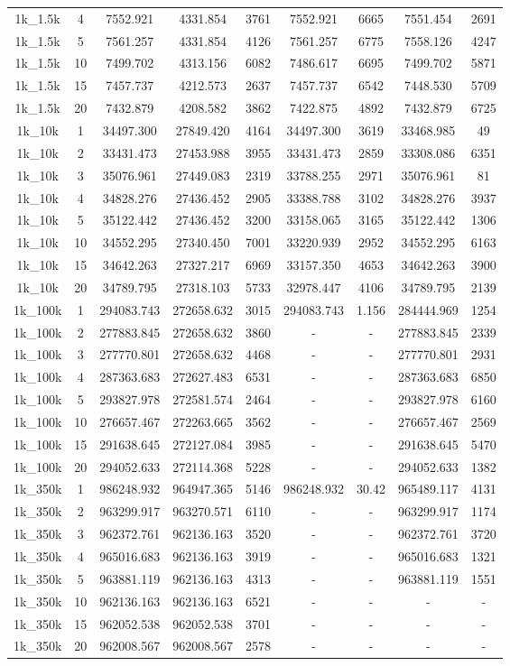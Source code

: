 \documentclass[10pt]{article}
\begin{document}
\begin{table}[h]
\begin{tabular}{ccc|cc|cc|cc}
{1k\_1.5k} & {4} & {7552.921} & {4331.854} & {3761} & {7552.921} & {6665} & {7551.454} & {2691}\tabularnewline
{1k\_1.5k} & {5} & {7561.257} & {4331.854} & {4126} & {7561.257} & {6775} & {7558.126} & {4247}\tabularnewline
{1k\_1.5k} & {10} & {7499.702} & {4313.156} & {6082} & {7486.617} & {6695} & {7499.702} & {5871}\tabularnewline
{1k\_1.5k} & {15} & {7457.737} & {4212.573} & {2637} & {7457.737} & {6542} & {7448.530} & {5709}\tabularnewline
{1k\_1.5k} & {20} & {7432.879} & {4208.582} & {3862} & {7422.875} & {4892} & {7432.879} & {6725}\tabularnewline
\hline 
{1k\_10k} & {1} & {34497.300} & {27849.420} & {4164} & {34497.300} & {3619} & {33468.985} & {49}\tabularnewline
{1k\_10k} & {2} & {33431.473} & {27453.988} & {3955} & {33431.473} & {2859} & {33308.086} & {6351}\tabularnewline
{1k\_10k} & {3} & {35076.961} & {27449.083} & {2319} & {33788.255} & {2971} & {35076.961} & {81}\tabularnewline
{1k\_10k} & {4} & {34828.276} & {27436.452} & {2905} & {33388.788} & {3102} & {34828.276} & {3937}\tabularnewline
{1k\_10k} & {5} & {35122.442} & {27436.452} & {3200} & {33158.065} & {3165} & {35122.442} & {1306}\tabularnewline
{1k\_10k} & {10} & {34552.295} & {27340.450} & {7001} & {33220.939} & {2952} & {34552.295} & {6163}\tabularnewline
{1k\_10k} & {15} & {34642.263} & {27327.217} & {6969} & {33157.350} & {4653} & {34642.263} & {3900}\tabularnewline
{1k\_10k} & {20} & {34789.795} & {27318.103} & {5733} & {32978.447} & {4106} & {34789.795} & {2139}\tabularnewline
\hline 
{1k\_100k} & {1} & {294083.743} & {272658.632} & {3015} & {294083.743} & {1.156} & {284444.969} & {1254}\tabularnewline
{1k\_100k} & {2} & {277883.845} & {272658.632} & {3860} & {-} & - & {277883.845} & {2339}\tabularnewline
{1k\_100k} & {3} & {277770.801} & {272658.632} & {4468} & {-} & - & {277770.801} & {2931}\tabularnewline
{1k\_100k} & {4} & {287363.683} & {272627.483} & {6531} & {-} & - & {287363.683} & {6850}\tabularnewline
{1k\_100k} & {5} & {293827.978} & {272581.574} & {2464} & {-} & {-} & {293827.978} & {6160}\tabularnewline
{1k\_100k} & {10} & {276657.467} & {272263.665} & {3562} & {-} & {-} & {276657.467} & {2569}\tabularnewline
{1k\_100k} & {15} & {291638.645} & {272127.084} & {3985} & {-} & - & {291638.645} & {5470}\tabularnewline
{1k\_100k} & {20} & {294052.633} & {272114.368} & {5228} & {-} & - & {294052.633} & {1382}\tabularnewline
\hline 
{1k\_350k} & {1} & {986248.932} & {964947.365} & {5146} & {986248.932} & {30.42} & {965489.117} & {4131}\tabularnewline
{1k\_350k} & {2} & {963299.917} & {963270.571} & {6110} & {-} & - & {963299.917} & {1174}\tabularnewline
{1k\_350k} & {3} & {962372.761} & {962136.163} & {3520} & {-} & - & {962372.761} & {3720}\tabularnewline
{1k\_350k} & {4} & {965016.683} & {962136.163} & {3919} & {-} & - & {965016.683} & {1321}\tabularnewline
{1k\_350k} & {5} & {963881.119} & {962136.163} & {4313} & {-} & {-} & {963881.119} & {1551}\tabularnewline
{1k\_350k} & {10} & {962136.163} & {962136.163} & {6521} & {-} & {-} & - & -\tabularnewline
{1k\_350k} & {15} & {962052.538} & {962052.538} & {3701} & {-} & - & - & -\tabularnewline
{1k\_350k} & {20} & {962008.567} & {962008.567} & {2578} & {-} & {-} & - & -\tabularnewline
\hline
\end{tabular}
\end{table}
\end{document}
